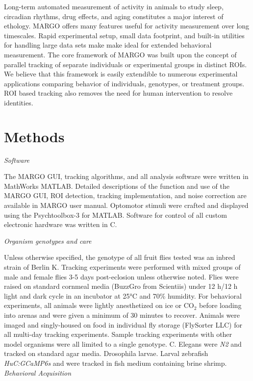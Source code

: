 \documentclass[10pt]{article}
\begin{document}
\begin{multicols}{2}
Long-term automated measurement of activity in animals to study sleep, circadian rhythms, drug effects, and aging constitutes a major interest of ethology. MARGO offers many features useful for activity measurement over long timescales. Rapid experimental setup, small data footprint, and built-in utilities for handling large data sets make make ideal for extended behavioral measurement. The core framework of MARGO was built upon the concept of parallel tracking of separate individuals or experimental groups in distinct ROIs. We believe that this framework is easily extendible to numerous experimental applications comparing behavior of individuals, genotypes, or treatment groups. ROI based tracking also removes the need for human intervention to resolve identities.  

\section*{Methods}

\textit{Software}

The MARGO GUI, tracking algorithms, and all analysis software were written in MathWorks MATLAB. Detailed descriptions of the function and use of the MARGO GUI, ROI detection, tracking implementation, and noise correction are available in MARGO user manual. Optomotor stimuli were crafted and displayed using the Psychtoolbox-3 for MATLAB. Software for control of all custom electronic hardware was written in C.

\textit{Organism genotypes and care}

Unless otherwise specified, the genotype of all fruit flies tested was an inbred strain of  Berlin K. Tracking experiments were performed with mixed groups of male and female flies 3-5 days post-eclosion unless otherwise noted.  Flies were raised on standard cornmeal media (BuzzGro from Scientiis) under 12 h/12 h light and dark cycle in an incubator at 25°C and 70\% humidity. For behavioral experiments, all animals were lightly anesthetized on ice or CO$_2$ before loading into arenas and were given a minimum of 30 minutes to recover. Animals were imaged and singly-housed on food in individual fly storage (FlySorter LLC) for all multi-day tracking experiments. Sample tracking experiments with other model organisms were all limited to a single genotype. C. Elegans were \textit{N2} and tracked on standard agar media. Drosophila larvae. Larval zebrafish \textit{HuC:GCaMP6s} and were tracked in fish medium containing brine shrimp.
\textit{Behavioral Acquisition}


\end{multicols}
\end{document}
